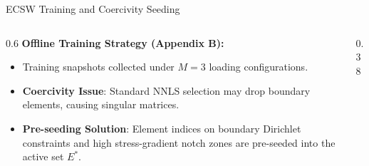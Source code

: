 \begin{frame}{ECSW Training and Coercivity Seeding}
    \begin{columns}
        \begin{column}{0.6\textwidth}
            \textbf{Offline Training Strategy (Appendix B):}
            \begin{itemize}
                \item Training snapshots collected under $M=3$ loading configurations.
                \item \textbf{Coercivity Issue}: Standard NNLS selection may drop boundary elements, causing singular matrices.
                \item \textbf{Pre-seeding Solution}: Element indices on boundary Dirichlet constraints and high stress-gradient notch zones are pre-seeded into the active set $E^*$.
            \end{itemize}
        \end{column}
        \begin{column}{0.38\textwidth}
            \centering
        \end{column}
    \end{columns}
\end{frame}

